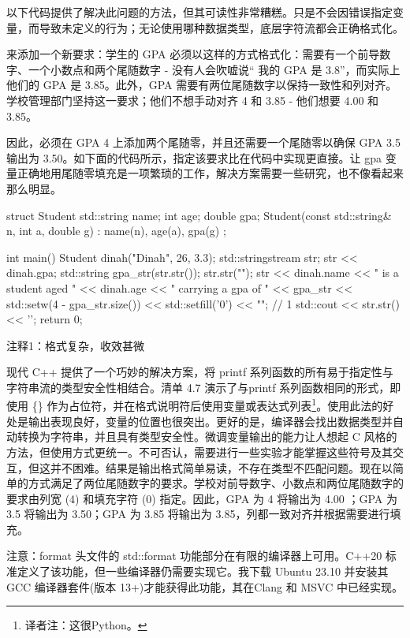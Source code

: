 以下代码提供了解决此问题的方法，但其可读性非常糟糕。只是不会因错误指定变量，而导致未定义的行为；无论使用哪种数据类型，底层字符流都会正确格式化。

来添加一个新要求：学生的 GPA 必须以这样的方式格式化：需要有一个前导数字、一个小数点和两个尾随数字 - 没有人会吹嘘说“ 我的 GPA 是 3.8”，而实际上他们的 GPA 是 3.85。此外，GPA 需要有两位尾随数字以保持一致性和列对齐。学校管理部门坚持这一要求；他们不想手动对齐 4 和 3.85 - 他们想要 4.00 和 3.85。

因此，必须在 GPA 4 上添加两个尾随零，并且还需要一个尾随零以确保 GPA 3.5 输出为 3.50。如下面的代码所示，指定该要求比在代码中实现更直接。让 gpa 变量正确地用尾随零填充是一项繁琐的工作，解决方案需要一些研究，也不像看起来那么明显。


\begin{cpp}
struct Student {
  std::string name;
  int age;
  double gpa;
  Student(const std::string& n, int a, double g) : name(n), age(a), gpa(g) {}
};

int main() {
  Student dinah("Dinah", 26, 3.3);
  std::stringstream str;
  str << dinah.gpa;
  std::string gpa_str(str.str());
  str.str("");
  str << dinah.name << " is a student aged " << dinah.age << " carrying a gpa of "
      << gpa_str << std::setw(4 - gpa_str.size()) << std::setfill('0') << ""; // 1
  std::cout << str.str() << '\n';
  return 0;
}
\end{cpp}

{\footnotesize
注释1：格式复杂，收效甚微
}


现代 C++ 提供了一个巧妙的解决方案，将 printf 系列函数的所有易于指定性与字符串流的类型安全性相结合。清单 4.7 演示了与printf 系列函数相同的形式，即使用 \{\} 作为占位符，并在格式说明符后使用变量或表达式列表\footnote{译者注：这很Python。}。使用此法的好处是输出表现良好，变量的位置也很突出。更好的是，编译器会找出数据类型并自动转换为字符串，并且具有类型安全性。微调变量输出的能力让人想起 C 风格的方法，但使用方式更统一。不可否认，需要进行一些实验才能掌握这些符号及其交互，但这并不困难。结果是输出格式简单易读，不存在类型不匹配问题。现在以简单的方式满足了两位尾随数字的要求。学校对前导数字、小数点和两位尾随数字的要求由列宽 (4) 和填充字符 (0) 指定。因此，GPA 为 4 将输出为 4.00 ；GPA 为 3.5 将输出为 3.50；GPA 为 3.85 将输出为 3.85，列都一致对齐并根据需要进行填充。

注意：format 头文件的 std::format 功能部分在有限的编译器上可用。C++20 标准定义了该功能，但一些编译器仍需要实现它。我下载 Ubuntu 23.10 并安装其 GCC 编译器套件(版本 13+)才能获得此功能，其在Clang 和 MSVC 中已经实现。

